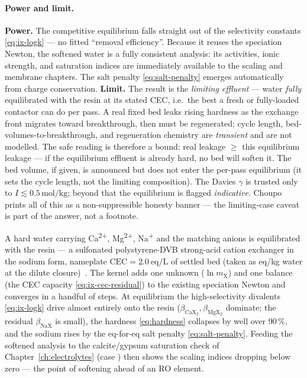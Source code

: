 \documentclass[11pt,a4paper]{article}
\begin{document}
\paragraph{Power and limit.}
\textbf{Power.} The competitive equilibrium falls straight out of the
selectivity constants \eqref{eq:ix-logk} --- no fitted ``removal
efficiency''.  Because it reuses the speciation Newton, the softened
water is a fully consistent analysis: its activities, ionic strength,
and saturation indices are immediately available to the scaling and
membrane chapters.  The salt penalty \eqref{eq:salt-penalty} emerges
automatically from charge conservation.
\textbf{Limit.} The result is the \emph{limiting effluent} --- water
\emph{fully} equilibrated with the resin at its stated CEC, i.e.\ the
best a fresh or fully-loaded contactor can do per pass.  A real fixed
bed leaks rising hardness as the exchange front migrates toward
breakthrough, then must be regenerated; cycle length,
bed-volumes-to-breakthrough, and regeneration chemistry are
\emph{transient} and are not modelled.  The safe reading is therefore a
bound: real leakage $\ge$ this equilibrium leakage --- if the
equilibrium effluent is already hard, no bed will soften it.  The bed
volume, if given, is announced but does not enter the per-pass
equilibrium (it sets the cycle length, not the limiting composition).
The Davies $\gamma$ is trusted only to $I\lesssim 0.5\,\mathrm{mol/kg}$;
beyond that the equilibrium is flagged \emph{indicative}.  Choupo prints
all of this as a non-suppressible honesty banner --- the limiting-case
caveat is part of the answer, not a footnote.

\begin{example}
A hard water carrying Ca\textsuperscript{2+}, Mg\textsuperscript{2+},
Na\textsuperscript{+} and the matching anions is equilibrated with the
 resin --- a sulfonated polystyrene-DVB strong-acid cation
exchanger in the sodium form, nameplate $\mathrm{CEC}=2.0\
\mathrm{eq/L}$ of settled bed (taken as eq/kg water at the dilute
closure)~\cite{Helfferich1962,Wachinski2017}.  The kernel adds one
unknown ($\ln m_{\mathrm X}$) and one balance (the CEC capacity
\eqref{eq:ix-cec-residual}) to the existing speciation Newton and
converges in a handful of steps.  At equilibrium the high-selectivity
divalents \eqref{eq:ix-logk} drive almost entirely onto the resin
($\beta_{\mathrm{CaX_2}}, \beta_{\mathrm{MgX_2}}$ dominate; the residual
$\beta_{\mathrm{NaX}}$ is small), the hardness \eqref{eq:hardness}
collapses by well over 90\,\%, and the sodium rises by the eq-for-eq
salt penalty \eqref{eq:salt-penalty}.  Feeding the softened analysis to
the calcite/gypsum saturation check of Chapter~\ref{ch:electrolytes}
(case \file{membrane08\_softened\_scaling}) then shows the scaling indices
dropping below zero --- the point of softening ahead of an RO element.
\end{example}
\end{document}
